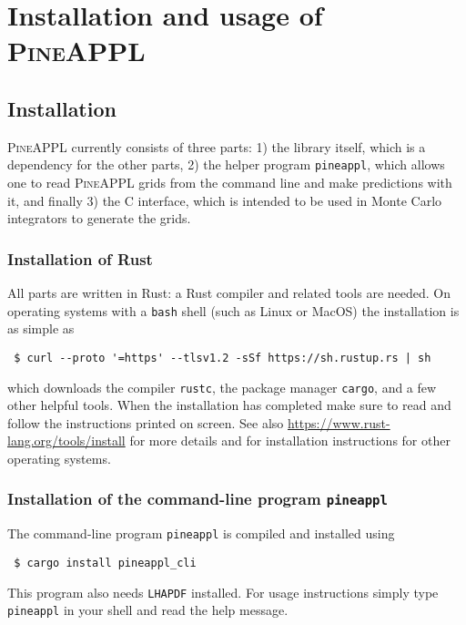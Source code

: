 \section{Installation and usage of \texorpdfstring{\textsc{PineAPPL}}{PineAPPL}}
\label{app:pineappl}

\subsection{Installation}
\label{app:installation}

\textsc{PineAPPL} currently consists of three parts: 1) the library itself, which is a dependency for the other parts, 2) the helper program \texttt{pineappl}, which allows one to read \textsc{PineAPPL} grids from the command line and make predictions with it, and finally 3) the C interface, which is intended to be used in Monte Carlo integrators to generate the grids.

\subsubsection*{Installation of Rust}


All parts are written in Rust: a Rust compiler and related tools are needed.
On operating systems with a \texttt{bash} shell (such as Linux or MacOS) the installation is as simple as
\begin{verbatim}
 $ curl --proto '=https' --tlsv1.2 -sSf https://sh.rustup.rs | sh
\end{verbatim}
which downloads the compiler \texttt{rustc}, the package manager \texttt{cargo}, and a few other helpful tools.
When the installation has completed make sure to read and follow the instructions printed on screen.
See also \url{https://www.rust-lang.org/tools/install} for more details and for installation instructions for other operating systems.

\subsubsection*{Installation of the command-line program \texorpdfstring{\texttt{pineappl}}{pineappl}}

The command-line program \texttt{pineappl} is compiled and installed using
\begin{verbatim}
 $ cargo install pineappl_cli
\end{verbatim}
This program also needs \texttt{LHAPDF} \cite{Buckley:2014ana} installed.
For usage instructions simply type \texttt{pineappl} in your shell and read the help message.

